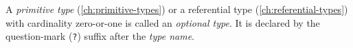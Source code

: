 A \emph{primitive type} (\ref{ch:primitive-types})
or a referential type (\ref{ch:referential-types})
with cardinality zero-or-one is called an \emph{optional type}.
It is declared by the question-mark (\verb|?|) suffix
after the \emph{type name}.
